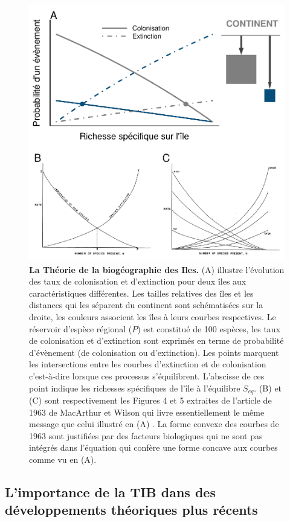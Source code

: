 \begin{figure}[htbp]
\centering
\includegraphics{fig/fig1.pdf}
\caption{\textbf{La Théorie de la biogéographie des Iles.} (A) illustre
l'évolution des taux de colonisation et d'extinction pour deux îles aux
caractéristiques différentes. Les tailles relatives des îles et les
distances qui les séparent du continent sont schématisées sur la droite,
les couleurs associent les îles à leurs courbes respectives. Le
réservoir d'espèce régional (\(P\)) est constitué de 100 espèces, les
taux de colonisation et d'extinction sont exprimés en terme de
probabilité d'évènement (de colonisation ou d'extinction). Les points
marquent les intersections entre les courbes d'extinction et de
colonisation c'est-à-dire lorsque ces processus s'équilibrent.
L'abscisse de ces point indique les richesses spécifiques de l'île à
l'équilibre \(S_{eq}\). (B) et (C) sont respectivement les Figures 4 et
5 extraites de l'article de 1963 de MacArthur et Wilson qui livre
essentiellement le même message que celui illustré en (A)
\citep{MacArthur1963}. La forme convexe des courbes de 1963 sont
justifiées par des facteurs biologiques qui ne sont pas intégrés dans
l'équation \label{eqMW} qui confère une forme concave aux courbes comme
vu en (A).\label{fig:figMW}}
\end{figure}

\subsection*{L'importance de la TIB dans des développements théoriques
plus
récents}\label{limportance-de-la-tib-dans-des-duxe9veloppements-thuxe9oriques-plus-ruxe9cents}

